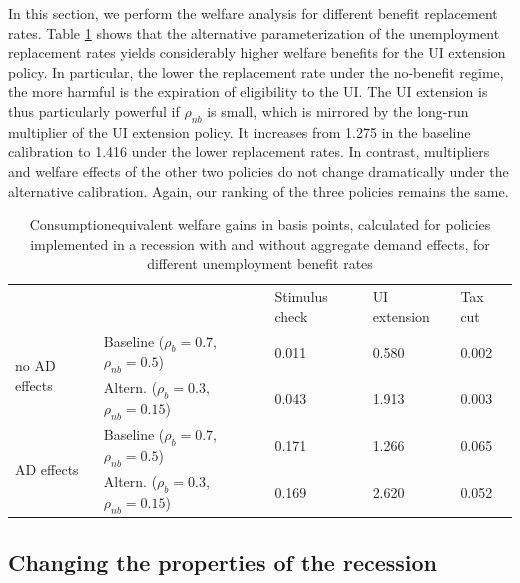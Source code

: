 \documentclass[../HAFiscal]{subfiles}
\begin{document}
In this section, we perform the welfare analysis for different benefit replacement rates. Table \ref{tab:robustness_benefit_results} shows that the alternative parameterization of the unemployment replacement rates yields considerably higher welfare benefits for the UI extension policy. In particular, the lower the replacement rate under the no-benefit regime, the more harmful is the expiration of eligibility to the UI. The UI extension is thus particularly powerful if $\rho_{nb}$ is small, which is mirrored by the long-run multiplier of the UI extension policy. It increases from 1.275 in the baseline calibration to 1.416 under the lower replacement rates. In contrast, multipliers and welfare effects of the other two policies do not change dramatically under the alternative calibration. Again, our ranking of the three policies remains the same.


\begin{table}[]
	\begin{center}
		\begin{tabular}{@{}lllll@{}}
			\toprule
			&                    & Stimulus check & UI extension & Tax cut \\ \cmidrule(l){1-5} 
			\multirow{2}{*}{no AD effects} 	& Baseline  ($\rho_{b}=0.7$, $\rho_{nb}=0.5$) 		& 0.011          & 0.580        & 0.002   \\
			& Altern.  ($\rho_{b}=0.3$, $\rho_{nb}=0.15$) 	& 0.043          & 1.913        & 0.003   \\ \cmidrule(l){1-5} 
			\multirow{2}{*}{AD effects}		& Baseline  ($\rho_{b}=0.7$, $\rho_{nb}=0.5$)    	& 0.171          & 1.266        & 0.065   \\
			& Altern.  ($\rho_{b}=0.3$, $\rho_{nb}=0.15$)    & 0.169          & 2.620        & 0.052   \\ \cmidrule(l){1-5} 
		\end{tabular}
		\caption{Consumptionequivalent welfare gains in basis points, calculated for policies implemented in a recession with and without aggregate demand effects, for different unemployment benefit rates}
		\label{tab:robustness_benefit_results}
	\end{center}
\end{table}




\FloatBarrier
\subsection{Changing the properties of the recession}
\end{document}
